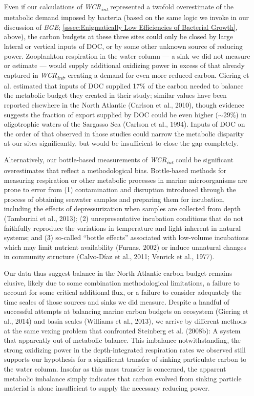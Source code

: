 Even if our calculations of \emph{WCR\textsubscript{int}} represented a twofold overestimate of the metabolic demand imposed by bacteria (based on the same logic we invoke in our discussion of \emph{BGE}; \autoref{sssec:Enigmatically Low Efficiencies of Bacterial Growth}, above), the carbon budgets at these three sites could only be closed by large lateral or vertical inputs of DOC, or by some other unknown source of reducing power. Zooplankton respiration in the water column --- a sink we did not measure or estimate --- would supply additional oxidizing power in excess of that already captured in \emph{WCR\textsubscript{int}}, creating a demand for even more reduced carbon. Giering et al. estimated that inputs of DOC supplied 17\% of the carbon needed to balance the metabolic budget they created in their study; similar values have been reported elsewhere in the North Atlantic (Carlson et al., 2010), though evidence suggests the fraction of export supplied by DOC could be even higher ($\sim 29$\%) in oligotrophic waters of the Sargasso Sea (Carlson et al., 1994). Inputs of DOC on the order of that observed in those studies could narrow the metabolic disparity at our sites significantly, but would be insufficient to close the gap completely.

Alternatively, our bottle-based measurements of \emph{WCR\textsubscript{int}} could be significant overestimates that reflect a methodological bias. Bottle-based methods for measuring respiration or other metabolic processes in marine microorganisms are prone to error from (1) contamination and disruption introduced through the process of obtaining seawater samples and preparing them for incubation, including the effects of depressurization when samples are collected from depth (Tamburini et al., 2013); (2) unrepresentative incubation conditions that do not faithfully reproduce the variations in temperature and light inherent in natural systems; and (3) so-called ``bottle effects'' associated with low-volume incubations which may limit nutrient availability (Furnas, 2002) or induce unnatural changes in community structure (Calvo-D\'{i}az et al., 2011; Venrick et al., 1977).

Our data thus suggest balance in the North Atlantic carbon budget remains elusive, likely due to some combination methodological limitations, a failure to account for some critical additional flux, or a failure to consider adequately the time scales of those sources and sinks we did measure. Despite a handful of successful attempts at balancing marine carbon budgets on ecosystem (Giering et al., 2014) and basin scales (Williams et al., 2013), we arrive by different methods at the same vexing problem that confronted Steinberg et al. (2008b): A system that apparently out of metabolic balance. This imbalance notwithstanding, the strong oxidizing power in the depth-integrated respiration rates we observed still supports our hypothesis for a significant transfer of sinking particulate carbon to the water column. Insofar as this mass transfer is concerned, the apparent metabolic imbalance simply indicates that carbon evolved from sinking particle material is alone insufficient to supply the necessary reducing power.

